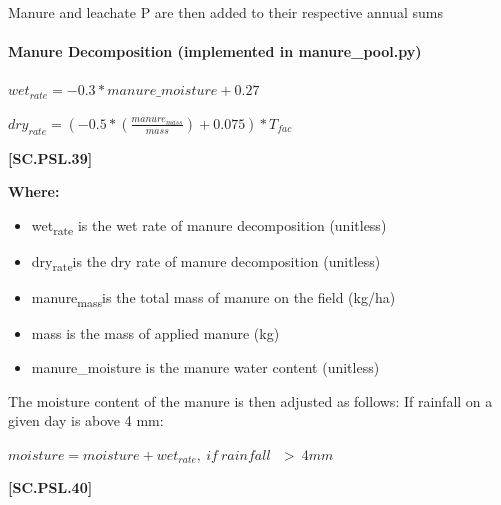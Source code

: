 Manure and leachate P are then added to their respective annual sums
\vspace{0.2cm}

\paragraph{Manure Decomposition (implemented in manure\_pool.py)}
        \vspace{0.5cm}
        
    \begin{center}
\(wet_{rate} = -0.3 * manure\_moisture + 0.27\)
\vspace{0.1cm}

\(dry_{rate} = (-0.5 *(\frac{manure_{mass}}{mass}) + 0.075) * T_{fac}\)
    \end{center}
        \vspace{0.5cm} 
    
            {\raggedleft \textbf{[SC.PSL.39]}\par}
            \vspace{0.5cm}

        \textbf{Where:}
            
        \begin{itemize}
            \item wet\textsubscript{rate} is the wet rate of manure decomposition (unitless)
            \item dry\textsubscript{rate}is the dry rate of manure decomposition (unitless)
            \item manure\textsubscript{mass}is the total mass of manure on the field (kg/ha)
            \item mass is the mass of applied manure (kg)
            \item manure\_moisture is the manure water content (unitless)
        \end{itemize}
        \vspace{0.5cm}

The moisture content of the manure is then adjusted as follows: If rainfall on a given day is above 4 mm:
        \vspace{0.5cm}
        
    \begin{center}
\(moisture = moisture+wet_{rate},\ if\ rainfall\ \ \ >\ 4 mm \)
    \end{center}
        \vspace{0.5cm} 
    
            {\raggedleft \textbf{[SC.PSL.40]}\par}
            \vspace{0.5cm}

